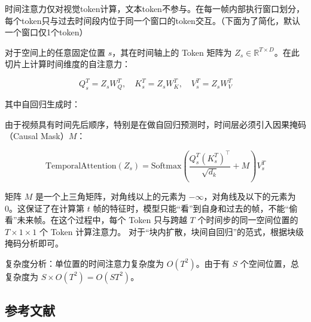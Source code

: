 时间注意力仅对视觉token计算，文本token不参与。在每一帧内部执行窗口划分，每个token只与过去时间段内位于同一个窗口的token交互。（下面为了简化，默认一个窗口仅1个token）

对于空间上的任意固定位置 \(s\)，其在时间轴上的 Token 矩阵为 \(Z_s\in\mathbb{R}^{T\times D}\)。在此切片上计算时间维度的自注意力：

\[
Q_s^T=Z_sW_Q^T,\quad K_s^T=Z_sW_K^T,\quad V_s^T=Z_sW_V^T
\]

其中自回归生成时：

由于视频具有时间先后顺序，特别是在做自回归预测时，时间层必须引入因果掩码（Causal Mask）\(M\)：

\[
\mathrm{TemporalAttention}(Z_s)=\mathrm{Softmax}\left(\frac{Q_s^T(K_s^T)^\top}{\sqrt{d_k}}+M\right)V_s^T
\]

矩阵 \(M\) 是一个上三角矩阵，对角线以上的元素为 \(-\infty\)，对角线及以下的元素为 0。这保证了在计算第 \(t\) 帧的特征时，模型只能``看''到自身和过去的帧，不能``偷看''未来帧。在这个过程中，每个 Token 只与跨越 \(T\) 个时间步的同一空间位置的 \(T\times 1\times 1\) 个 Token 计算注意力。
对于``块内扩散，块间自回归''的范式，根据块级掩码分析即可。

复杂度分析：单位置的时间注意力复杂度为 \(O(T^2)\)。由于有 \(S\) 个空间位置，总复杂度为 \(S\times O(T^2)=O(ST^2)\)。

\FloatBarrier
{}
\hypertarget{ux53c2ux8003ux6587ux732e-138}{%
\subsection{参考文献}\label{ux53c2ux8003ux6587ux732e-138}}

